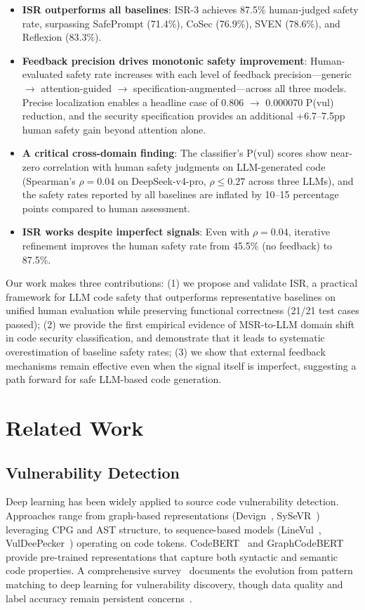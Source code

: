 \documentclass[10pt,conference]{IEEEtran}
\begin{document}
\begin{itemize}
\item \textbf{ISR outperforms all baselines}: ISR-3 achieves 87.5\% human-judged safety rate, surpassing SafePrompt (71.4\%), CoSec (76.9\%), SVEN (78.6\%), and Reflexion (83.3\%).
\item \textbf{Feedback precision drives monotonic safety improvement}: Human-evaluated safety rate increases with each level of feedback precision---generic $\rightarrow$ attention-guided $\rightarrow$ specification-augmented---across all three models. Precise localization enables a headline case of 0.806 $\rightarrow$ 0.000070 P(vul) reduction, and the security specification provides an additional +6.7--7.5pp human safety gain beyond attention alone.
\item \textbf{A critical cross-domain finding}: The classifier's P(vul) scores show near-zero correlation with human safety judgments on LLM-generated code (Spearman's $\rho=0.04$ on DeepSeek-v4-pro, $\rho \leq 0.27$ across three LLMs), and the safety rates reported by all baselines are inflated by 10--15 percentage points compared to human assessment.
\item \textbf{ISR works despite imperfect signals}: Even with $\rho=0.04$, iterative refinement improves the human safety rate from 45.5\% (no feedback) to 87.5\%.
\end{itemize}

Our work makes three contributions: (1) we propose and validate ISR, a practical framework for LLM code safety that outperforms representative baselines on unified human evaluation while preserving functional correctness (21/21 test cases passed); (2) we provide the first empirical evidence of MSR-to-LLM domain shift in code security classification, and demonstrate that it leads to systematic overestimation of baseline safety rates; (3) we show that external feedback mechanisms remain effective even when the signal itself is imperfect, suggesting a path forward for safe LLM-based code generation.

\section{Related Work}

\subsection{Vulnerability Detection}

Deep learning has been widely applied to source code vulnerability detection. Approaches range from graph-based representations (Devign~\cite{devign}, SySeVR~\cite{sysevr}) leveraging CPG and AST structure, to sequence-based models (LineVul~\cite{linevul}, VulDeePecker~\cite{vuldeepecker}) operating on code tokens. CodeBERT~\cite{codebert} and GraphCodeBERT~\cite{graphcodebert} provide pre-trained representations that capture both syntactic and semantic code properties. A comprehensive survey~\cite{vuldetectionsurvey,llmsecuritysurvey} documents the evolution from pattern matching to deep learning for vulnerability discovery, though data quality and label accuracy remain persistent concerns~\cite{primevul}.
\end{document}
